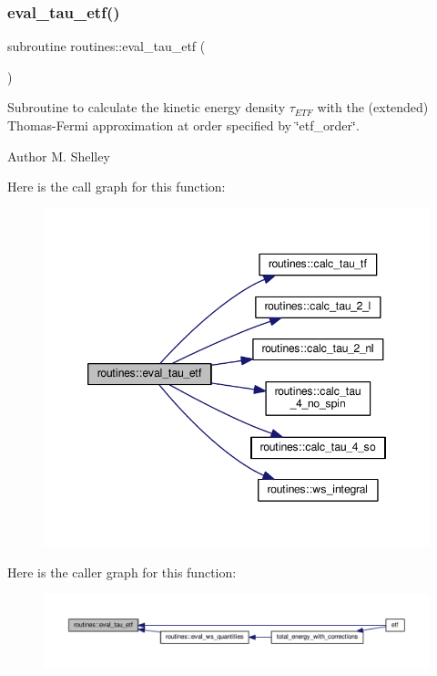 \subsubsection{\texorpdfstring{eval\+\_\+tau\+\_\+etf()}{eval\_tau\_etf()}}
{\footnotesize\ttfamily subroutine routines\+::eval\+\_\+tau\+\_\+etf (\begin{DoxyParamCaption}{ }\end{DoxyParamCaption})}



Subroutine to calculate the kinetic energy density $\tau_{ETF}$ with the (extended) Thomas-\/\+Fermi approximation at order specified by \char`\"{}etf\+\_\+order\char`\"{}. 

\begin{DoxyAuthor}{Author}
M. Shelley 
\end{DoxyAuthor}
Here is the call graph for this function\+:
\nopagebreak
\begin{figure}[H]
\begin{center}
\leavevmode
\includegraphics[width=346pt]{namespaceroutines_a97bfcff7e603cf9df3dcd48ae21b4612_cgraph}
\end{center}
\end{figure}
Here is the caller graph for this function\+:
\nopagebreak
\begin{figure}[H]
\begin{center}
\leavevmode
\includegraphics[width=350pt]{namespaceroutines_a97bfcff7e603cf9df3dcd48ae21b4612_icgraph}
\end{center}
\end{figure}
\mbox{\label{namespaceroutines_a6ee5e5cd7ce81b013d18b19f5f9a4092}} 
